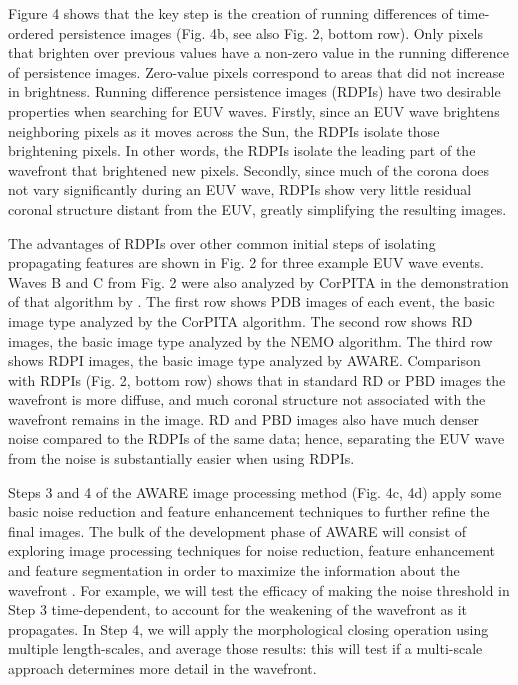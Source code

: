 Figure 4 shows that the key step is the creation of running differences of time-ordered persistence images (Fig. 4b, see also Fig. 2, bottom row).  Only pixels that brighten over previous values have a non-zero value in the running difference of persistence images.  Zero-value pixels correspond to areas that did not increase in brightness.  Running difference persistence images (RDPIs) have two desirable properties when searching for EUV waves.  Firstly, since an EUV wave brightens neighboring pixels as it moves across the Sun, the RDPIs isolate those brightening pixels.  In other words, the RDPIs isolate the leading part of the wavefront that brightened new pixels.  Secondly, since much of the corona does not vary significantly during an EUV wave, RDPIs show very little residual coronal structure distant from the EUV, greatly simplifying the resulting images.  

The advantages of RDPIs over other common initial steps of isolating propagating features are shown in Fig. 2 for three example EUV wave events. Waves B and C from Fig. 2 were also analyzed by CorPITA in the demonstration of that algorithm by \citet{2014SoPh..289.3279L}.  The first row shows PDB images of each event, the basic image type analyzed by the CorPITA algorithm.  The second row shows RD images, the basic image type analyzed by the NEMO algorithm.  The third row shows RDPI images, the basic image type analyzed by AWARE. Comparison with RDPIs (Fig. 2, bottom row) shows that in standard RD or PBD images the wavefront is more diffuse, and much coronal structure not associated with the wavefront remains in the image. RD and PBD images also have much denser noise compared to the RDPIs of the same data; hence, separating the EUV wave from the noise is substantially easier when using RDPIs.   

Steps 3 and 4 of the AWARE image processing method (Fig. 4c, 4d) apply some basic noise reduction and feature enhancement techniques to further refine the final images.  The bulk of the development phase of AWARE will consist of exploring image processing techniques for noise reduction, feature enhancement and feature segmentation in order to maximize the information about the wavefront \citep[see][ch. 3, 4, 5, 9 \& 10 for many potential improvements]{2002dip..book.....G}.  For example, we will test the efficacy of making the noise threshold in Step 3 time-dependent, to account for the weakening of the wavefront as it propagates.  In Step 4, we will apply the morphological closing operation using multiple length-scales, and average those results: this will test if a multi-scale approach determines more detail in the wavefront.

